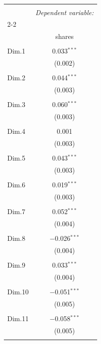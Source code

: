 
\begin{table}[h] \centering 
  \caption{} 
  \label{} 
\begin{tabular}{@{\extracolsep{5pt}}lc} 
\\[-1.8ex]\hline 
\hline \\[-1.8ex] 
 & \multicolumn{1}{c}{\textit{Dependent variable:}} \\ 
\cline{2-2} 
\\[-1.8ex] & shares \\ 
\hline \\[-1.8ex] 
 Dim.1 & 0.033$^{***}$ \\ 
  & (0.002) \\ 
  & \\ 
 Dim.2 & 0.044$^{***}$ \\ 
  & (0.003) \\ 
  & \\ 
 Dim.3 & 0.060$^{***}$ \\ 
  & (0.003) \\ 
  & \\ 
 Dim.4 & 0.001 \\ 
  & (0.003) \\ 
  & \\ 
 Dim.5 & 0.043$^{***}$ \\ 
  & (0.003) \\ 
  & \\ 
 Dim.6 & 0.019$^{***}$ \\ 
  & (0.003) \\ 
  & \\ 
 Dim.7 & 0.052$^{***}$ \\ 
  & (0.004) \\ 
  & \\ 
 Dim.8 & $-$0.026$^{***}$ \\ 
  & (0.004) \\ 
  & \\ 
 Dim.9 & 0.033$^{***}$ \\ 
  & (0.004) \\ 
  & \\ 
 Dim.10 & $-$0.051$^{***}$ \\ 
  & (0.005) \\ 
  & \\ 
 Dim.11 & $-$0.058$^{***}$ \\ 
  & (0.005) \\ 
  & \\ 

\end{tabular}
\end{table}
